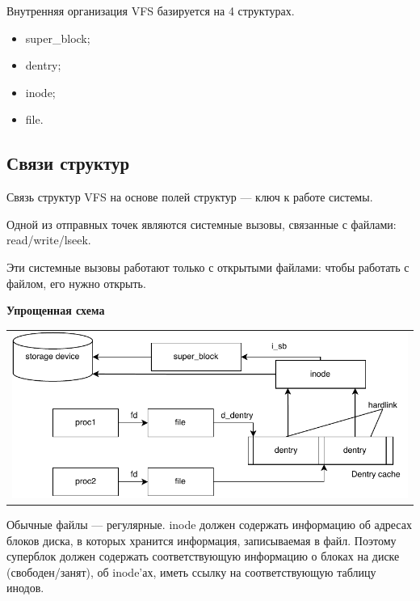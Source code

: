 Внутренняя организация VFS базируется на 4 структурах.

\begin{itemize}
    \item super\_block;
    \item dentry;
    \item inode;
    \item file.
\end{itemize}

\subsection{Связи структур}
Связь структур VFS на основе полей структур --- ключ к работе системы.

Одной из отправных точек являются системные вызовы, связанные с файлами: read/write/lseek. 

Эти системные вызовы работают только с открытыми файлами: чтобы работать с файлом, его нужно открыть.

\textbf{Упрощенная схема}
\begin{table}[h!]
  \centering
  \begin{tabular}{p{1\linewidth}}
    \centering
    \includegraphics[width=0.8\linewidth]{./images/struct_connect.pdf}
  \end{tabular}
\end{table}

Обычные файлы --- регулярные. inode должен содержать информацию об адресах блоков диска, в которых хранится информация, записываемая в файл. Поэтому суперблок должен содержать соответствующую информацию о блоках на диске (свободен/занят), об inode'ах, иметь ссылку на соответствующую таблицу инодов.

